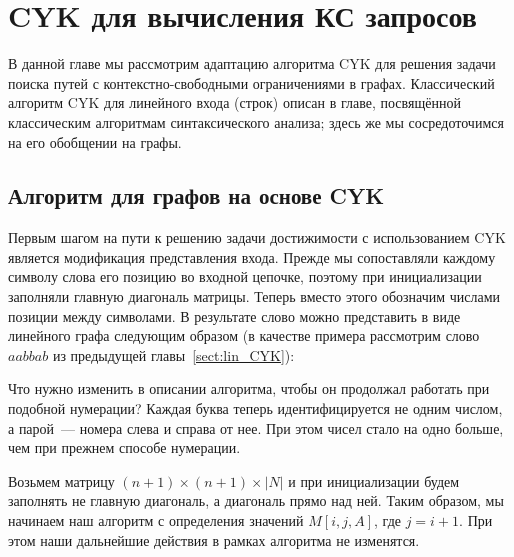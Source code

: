 \setchapterpreamble[u]{\margintoc}
\chapter{CYK для вычисления КС запросов}
\label{chpt:CFPQ_CYK}

В данной главе мы рассмотрим адаптацию алгоритма CYK для решения задачи поиска путей с контекстно-свободными ограничениями в графах.
Классический алгоритм CYK для линейного входа (строк) описан в главе, посвящённой классическим алгоритмам синтаксического анализа; здесь же мы сосредоточимся на его обобщении на графы.

\section{Алгоритм для графов на основе CYK}
\label{graph:CYK}

Первым шагом на пути к решению задачи достижимости с использованием CYK является модификация представления входа.
Прежде мы сопоставляли каждому символу слова его позицию во входной цепочке, поэтому при инициализации заполняли главную диагональ матрицы.
Теперь вместо этого обозначим числами позиции между символами.
В результате слово можно представить в виде линейного графа следующим образом (в качестве примера рассмотрим слово $a a b b a b$ из предыдущей главы~\ref{sect:lin_CYK}):
\begin{center}
\end{center}

Что нужно изменить в описании алгоритма, чтобы он продолжал работать при подобной нумерации?
Каждая буква теперь идентифицируется не одним числом, а парой~--- номера слева и справа от нее.
При этом чисел стало на одно больше, чем при прежнем способе нумерации.

Возьмем матрицу $(n + 1) \times (n + 1) \times  |N|$ и при инициализации будем заполнять не главную диагональ, а диагональ прямо над ней.
Таким образом, мы начинаем наш алгоритм с определения значений $M[i, j, A]$, где  $j = i + 1$.
При этом наши дальнейшие действия в рамках алгоритма не изменятся.

